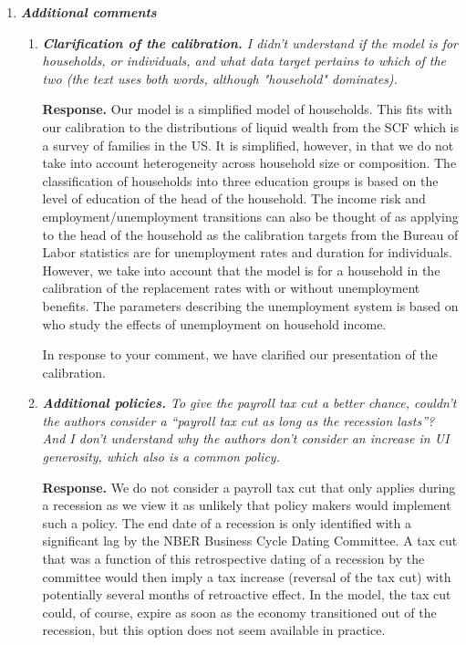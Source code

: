 \documentclass[12pt,letterpaper,english]{article}
\begin{document}
\begin{enumerate}
\item \textit{\textbf{Additional comments}} 

	\begin{enumerate}
		\item \textit{\textbf{Clarification of the calibration.} I didn't understand if the model is for households, or individuals, and what data target pertains to which of the two (the text uses both words, although "household" dominates).}
		
		\noindent \textbf{Response.} Our model is a simplified model of households. This fits with our calibration to the distributions of liquid wealth from the SCF which is a survey of families in the US. It is simplified, however, in that we do not take into account heterogeneity across household size or composition. The classification of households into three education groups is based on the level of education of the head of the household. The income risk and employment/unemployment transitions can also be thought of as applying to the head of the household as the calibration targets from the Bureau of Labor statistics are for unemployment rates and duration for individuals. However, we take into account that the model is for a household in the calibration of the replacement rates with or without unemployment benefits. The parameters describing the unemployment system is based on \citet{rothstein2017scraping} who study the effects of unemployment on household income. 
		
		In response to your comment, we have clarified our presentation of the calibration. 
		
		\item \textit{\textbf{Additional policies.} To give the payroll tax cut a better chance, couldn't the authors consider a ``payroll tax cut as long as the recession lasts''? And I don't understand why the authors don't consider an increase in UI generosity, which also is a common policy.}
						
		\noindent \textbf{Response.} We do not consider a payroll tax cut that only applies during a recession as we view it as unlikely that policy makers would implement such a policy. The end date of a recession is only identified with a significant lag by the NBER Business Cycle Dating Committee. A tax cut that was a function of this retrospective dating of a recession by the committee would then imply a tax increase (reversal of the tax cut) with potentially several months of retroactive effect. In the model, the tax cut could, of course, expire as soon as the economy transitioned out of the recession, but this option does not seem available in practice. 
		

\end{enumerate}
\end{enumerate}
\end{document}
